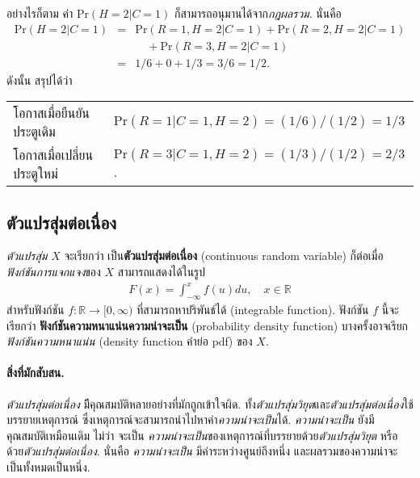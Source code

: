 อย่างไรก็ตาม ค่า $\mathrm{Pr}(H = 2|C = 1)$ ก็สามารถอนุมานได้จาก\textit{กฎผลรวม}.
นั่นคือ
\begin{eqnarray}
\mathrm{Pr}(H = 2|C = 1) 
&=& \mathrm{Pr}(R = 1, H = 2|C = 1) +
\mathrm{Pr}(R = 2, H = 2|C = 1) 
\nonumber \\
&\;& \quad
+
\mathrm{Pr}(R = 3, H = 2|C = 1)
\nonumber \\
&=& 1/6 + 0 + 1/3 = 3/6 = 1/2
\nonumber .
\end{eqnarray}
ดังนั้น สรุปได้ว่า
\\
\begin{tabular}{ll}
โอกาสเมื่อยืนยันประตูเดิม &
$\mathrm{Pr}(R = 1|C =1, H = 2) = (1/6)/(1/2) = 1/3$
\\
โอกาสเมื่อเปลี่ยนประตูใหม่ &
$\mathrm{Pr}(R = 3|C =1, H = 2) = (1/3)/(1/2) = 2/3$.
\end{tabular}

\subsection{ตัวแปรสุ่มต่อเนื่อง}
\label{sec: continuous random variable}
\textit{ตัวแปรสุ่ม} $X$ จะเรียกว่า
เป็น\textbf{ตัวแปรสุ่มต่อเนื่อง} (continuous random variable)
ก็ต่อเมื่อ
\textit{ฟังก์ชันการแจกแจง}ของ $X$
สามารถแสดงได้ในรูป
\begin{eqnarray}
F(x) = \int_{-\infty}^x f(u) du
,
\quad x \in \mathbb{R}
\label{eq: prob continuous rv}
\end{eqnarray}
สำหรับฟังก์ชัน
$f: \mathbb{R} \rightarrow [0, \infty)$
ที่สามารถหาปริพันธ์ได้ (integrable function).
ฟังก์ชัน $f$ นี้จะเรียกว่า 
\textbf{ฟังก์ชันความหนาแน่นความน่าจะเป็น}
(probability density function) บางครั้งอาจเรียก
\textit{ฟังก์ชันความหนาแน่น} (density function คำย่อ pdf) ของ $X$.

\paragraph{สิ่งที่มักสับสน.}
\textit{ตัวแปรสุ่มต่อเนื่อง}
มีีคุณสมบัติหลายอย่างที่มักถูกเข้าใจผิด.
ทั้ง\textit{ตัวแปรสุ่มวิยุต}และ\textit{ตัวแปรสุ่มต่อเนื่อง}ใช้บรรยายเหตุการณ์ ซึ่งเหตุการณ์จะสามารถนำไปหาค่า\textit{ความน่าจะเป็น}ได้.
\textit{ความน่าจะเป็น}
ยังมีคุณสมบัติเหมือนเดิม 
ไม่ว่า
จะเป็น
\textit{ความน่าจะเป็น}ของเหตุการณ์ที่บรรยายด้วย\textit{ตัวแปรสุ่มวิยุต}
หรือด้วย\textit{ตัวแปรสุ่มต่อเนื่อง}.
นั่นคือ
\textit{ความน่าจะเป็น}
มีค่าระหว่างศูนย์ถึงหนึ่ง 
และผลรวมของความน่าจะเป็นทั้งหมดเป็นหนึ่ง.

